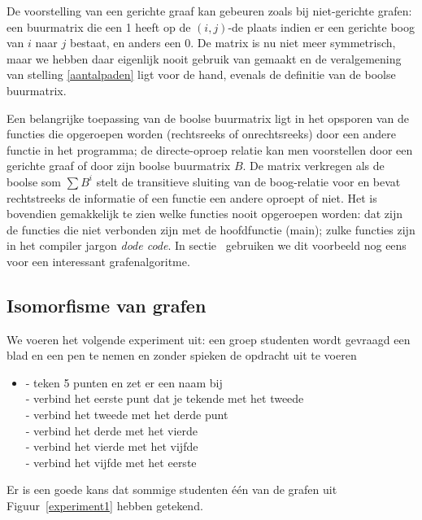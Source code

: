 De voorstelling van een gerichte graaf kan gebeuren zoals bij
niet-gerichte grafen: een buurmatrix die een 1 heeft op de $(i,j)$-de
plaats indien er een gerichte boog van $i$ naar $j$ bestaat, en anders
een 0. De matrix is nu niet meer symmetrisch, maar we hebben daar
eigenlijk nooit gebruik van gemaakt en de veralgemening van stelling
\ref{aantalpaden} ligt voor de hand, evenals de definitie van de
boolse buurmatrix.



Een belangrijke toepassing van de boolse buurmatrix ligt in het
opsporen van de functies die opgeroepen worden (rechtsreeks of
onrechtsreeks) door een andere functie in het programma; de
directe-oproep relatie kan men voorstellen door een gerichte graaf of
door zijn boolse buurmatrix $B$. De matrix verkregen als de boolse som
$\sum B^{i}$ stelt de transitieve sluiting van de boog-relatie voor en
bevat rechtstreeks de informatie of een functie een andere oproept of
niet. Het is bovendien gemakkelijk te zien welke functies nooit
opgeroepen worden: dat zijn de functies die niet verbonden zijn met de
hoofdfunctie (main);
zulke functies zijn in het compiler jargon {\em dode code}. In
sectie~ gebruiken we dit voorbeeld nog eens voor een
interessant grafenalgoritme.

\subsection{Isomorfisme van grafen}

We voeren het volgende experiment uit: een groep studenten wordt
gevraagd een blad en een pen te nemen en zonder spieken de opdracht
uit te voeren

\begin{itemize}
\item[]
- teken 5 punten en zet er een naam bij \\
- verbind het eerste punt dat je tekende met het tweede\\
- verbind het tweede met het derde punt\\
- verbind het derde met het vierde\\
- verbind het vierde met het vijfde\\
- verbind het vijfde met het eerste\\
\end{itemize}

Er is een goede kans dat sommige studenten \'{e}\'{e}n van de grafen
uit Figuur~\ref{experiment1} hebben getekend.

